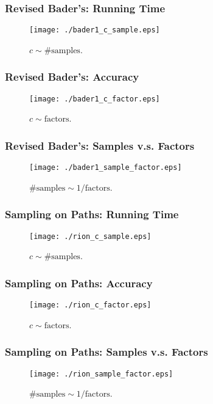 \documentclass[12pt]{beamer}
\begin{document}
\begin{frame}
	\frametitle{Revised Bader's: Running Time}
	\begin{figure}
	\texttt{[image: ./bader1\_c\_sample.eps]}
\caption{$c \sim \textrm{\# samples}$.}
\end{figure}
\end{frame}

\begin{frame}
	\frametitle{Revised Bader's: Accuracy}
	\begin{figure}
	\texttt{[image: ./bader1\_c\_factor.eps]}
\caption{$c \sim \textrm{factors}$.}
\end{figure}
\end{frame}

\begin{frame}
	\frametitle{Revised Bader's: Samples v.s. Factors}
	\begin{figure}
	\texttt{[image: ./bader1\_sample\_factor.eps]}
\caption{$\textrm{\# samples} \sim 1/\textrm{factors}$.}
\end{figure}
\end{frame}

\begin{frame}
	\frametitle{Sampling on Paths: Running Time}
	\begin{figure}
	\texttt{[image: ./rion\_c\_sample.eps]}
\caption{$c \sim \textrm{\# samples}$.}
\end{figure}
\end{frame}

\begin{frame}
	\frametitle{Sampling on Paths: Accuracy}
	\begin{figure}
	\texttt{[image: ./rion\_c\_factor.eps]}
\caption{$c \sim \textrm{factors}$.}
\end{figure}
\end{frame}

\begin{frame}
	\frametitle{Sampling on Paths: Samples v.s. Factors}
	\begin{figure}
	\texttt{[image: ./rion\_sample\_factor.eps]}
\caption{$\textrm{\# samples} \sim 1/\textrm{factors}$.}
\end{figure}
\end{frame}
\end{document}
